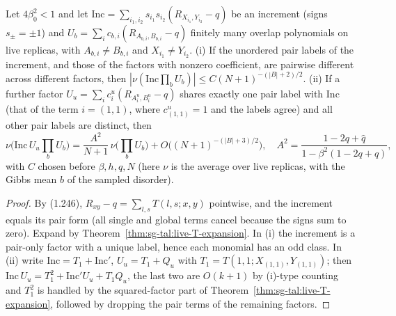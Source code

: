 \begin{theorem}
\label{thm:sg-tal:increment-products}
\leanok
{}
Let $4\beta_0^2<1$ and let $\mathrm{Inc}=\sum_{i_1,i_2}s_{i_1}s_{i_2}(R_{X_{i_1},Y_{i_2}}-q)$ be an increment
(signs $s_{\pm}=\pm1$) and $U_b=\sum_ic_{b,i}(R_{A_{b,i},B_{b,i}}-q)$ finitely many overlap polynomials
on live replicas, with $A_{b,i}\ne B_{b,i}$ and $X_{i_1}\ne Y_{i_2}$. (i) If the unordered pair labels of
the increment, and those of the factors with nonzero coefficient, are pairwise different across
different factors, then $|\nu(\mathrm{Inc}\prod_bU_b)|\le C(N+1)^{-(|B|+2)/2}$. (ii) If a further
factor $U_u=\sum_ic^u_i(R_{A^u_i,B^u_i}-q)$ shares exactly one pair label with $\mathrm{Inc}$ (that of
the term $i=(1,1)$, where $c^u_{(1,1)}=1$ and the labels agree) and all other pair labels are distinct,
then
\[
 \nu\Big(\mathrm{Inc}\,U_u\prod_bU_b\Big)=\frac{A^2}{N+1}\,\nu\Big(\prod_bU_b\Big)+O\big((N+1)^{-(|B|+3)/2}\big),
 \quad A^2=\frac{1-2q+\hat q}{1-\beta^2(1-2q+\hat q)},
\]
with $C$ chosen before $\beta,h,q,N$ (here $\nu$ is the average over live replicas, with the
Gibbs mean $b$ of the sampled disorder).
\end{theorem}
\begin{proof}
\leanok
By (1.246), $R_{xy}-q=\sum_{l,s}T(l,s;x,y)$ pointwise, and the increment equals its pair form (all single and global
terms cancel because the signs sum to zero). Expand by Theorem~\ref{thm:sg-tal:live-T-expansion}. In (i)
the increment is a pair-only factor with a unique label, hence each monomial has an odd class. In (ii)
write $\mathrm{Inc}=T_1+\mathrm{Inc}'$, $U_u=T_1+Q_u$ with $T_1=T(1,1;X_{(1,1)},Y_{(1,1)})$;
then $\mathrm{Inc}\,U_u=T_1^2+\mathrm{Inc}'U_u+T_1Q_u$, the last two are $O(k+1)$ by (i)-type counting
and $T_1^2$ is handled by the squared-factor part of Theorem~\ref{thm:sg-tal:live-T-expansion}, followed by
dropping the pair terms of the remaining factors.
\end{proof}


